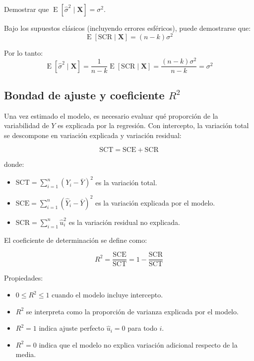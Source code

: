 \documentclass[11pt,a4paper]{article}
\DeclareMathOperator{\E}{E}
\newenvironment{demostración}[1][]{%
\begin{tcolorbox}[
ccdebox,
colback=white,
colframe=ccdeaccent,
title={Demostración\ifstrempty{#1}{}{ -- #1}},
boxed title style={colback=ccdeaccent}
]
}{\end{tcolorbox}}
\begin{document}
\begin{demostración}[Insesgadez de $\hat{\sigma}^2$]
 
Demostrar que $\E[\hat{\sigma}^2 \mid \mathbf{X}] = \sigma^2$.
 
Bajo los supuestos clásicos (incluyendo errores esféricos), puede demostrarse que:
\[
\E[\text{SCR} \mid \mathbf{X}] = (n-k)\sigma^2
\]
 
Por lo tanto:
\[
\E[\hat{\sigma}^2 \mid \mathbf{X}] = \frac{1}{n-k}\E[\text{SCR} \mid \mathbf{X}] = \frac{(n-k)\sigma^2}{n-k} = \sigma^2
\]
 
\end{demostración}
 
\subsection{Bondad de ajuste y coeficiente \(R^2\)}

Una vez estimado el modelo, es necesario evaluar qué proporción de la variabilidad de \(Y\) es explicada por la regresión. Con intercepto, la variación total se descompone en variación explicada y variación residual:

\begin{teorema}[Identidad Fundamental SCT = SCE + SCR]

\begin{resultado}
\[
\boxed{\text{SCT} = \text{SCE} + \text{SCR}}
\]
\end{resultado}

donde:
\begin{itemize}[noitemsep]
    \item \(\text{SCT}=\sum_{i=1}^{n}(Y_i-\bar{Y})^2\) es la variación total.
    \item \(\text{SCE}=\sum_{i=1}^{n}(\hat{Y}_i-\bar{Y})^2\) es la variación explicada por el modelo.
    \item \(\text{SCR}=\sum_{i=1}^{n}\hat{u}_i^2\) es la variación residual no explicada.
\end{itemize}

El coeficiente de determinación se define como:

\begin{resultado}
\[
\boxed{R^2 = \frac{\text{SCE}}{\text{SCT}} = 1 - \frac{\text{SCR}}{\text{SCT}}}
\]
\end{resultado}

Propiedades:
\begin{itemize}[noitemsep]
    \item \(0 \leq R^2 \leq 1\) cuando el modelo incluye intercepto.
    \item \(R^2\) se interpreta como la proporción de varianza explicada por el modelo.
    \item \(R^2=1\) indica ajuste perfecto \(\hat{u}_i=0\) para todo \(i\).
    \item \(R^2=0\) indica que el modelo no explica variación adicional respecto de la media.
\end{itemize}

\end{teorema}
 
\end{document}
